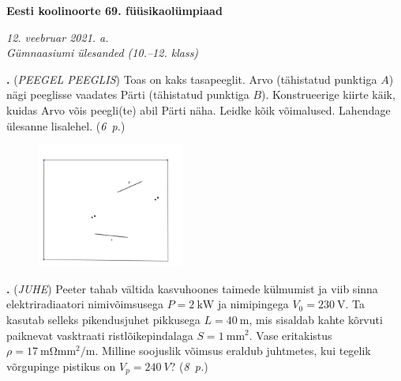 \documentclass[11pt,a5paper]{article}
\newcommand{\numb}[1]{\vspace{5pt}\textbf{\large #1}}
\newcommand{\nimi}[1]{(\textsl{\small #1})}
\newcommand{\punktid}[1]{(\emph{#1~p.})}
\newcounter{ylesanne}
\newcommand{\yl}[1]{\addtocounter{ylesanne}{1}\numb{\theylesanne.} \nimi{#1} \newblock{}}
\newcommand{\autor}[1]{}%
\begin{document}
\begin{center}
  \textbf{\Large Eesti koolinoorte 69. füüsikaolümpiaad} \par
  \emph{12. veebruar 2021. a.\\Gümnaasiumi ülesanded (10.--12. klass)}
\end{center}

 \par

\yl{PEEGEL PEEGLIS}
Toas on kaks tasapeeglit. Arvo (tähistatud punktiga $A$) nägi peeglisse vaadates Pärti (tähistatud punktiga $B$). Konstrueerige kiirte käik, kuidas Arvo võis peegli(te) abil Pärti näha. Leidke kõik võimalused. Lahendage ülesanne lisalehel.
\punktid{6} \autor{Richard Luhtaru}
\begin{figure}[h]
  \vspace{-1em}
  \centering
  \includegraphics[height=11em, trim=0 80 0 140, clip]{spiegel_joonis}
  \vspace{-2em}
\end{figure}

\yl{JUHE}
Peeter tahab vältida kasvuhoones taimede külmumist ja viib sinna elektriradiaatori nimivõimsusega $P=\qty{2}{\kW}$ ja nimipingega $V_0=\qty{230}{\V}$. Ta kasutab selleks pikendusjuhet pikkusega $L=\qty{40}{\m}$, mis  sisaldab kahte kõrvuti paiknevat vasktraati ristlõikepindalaga $S=\qty{1}{\mm\squared}$. Vase eritakistus $\rho=\qty{17}{\mohm\mm\squared\per\m}$. Milline soojuslik võimsus eraldub juhtmetes, kui tegelik võrgupinge pistikus on $V_p=\qty{240}{V}$?
\punktid{8} \autor{Jaan Kalda}
\end{document}
